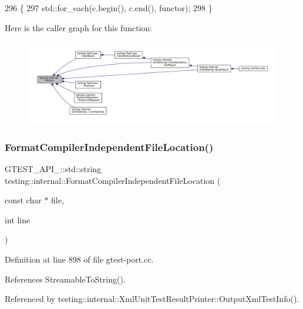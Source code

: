 \begin{DoxyCode}
296                                                   \{
297   std::for\_each(c.begin(), c.end(), functor);
298 \}
\end{DoxyCode}
Here is the caller graph for this function\+:
\nopagebreak
\begin{figure}[H]
\begin{center}
\leavevmode
\includegraphics[width=350pt]{namespacetesting_1_1internal_a52f5504ed65d116201ccb8f99a44fd7e_icgraph}
\end{center}
\end{figure}
\mbox{\label{namespacetesting_1_1internal_a1ee4cde97868c53e442d3182496a9f3c}} 
\subsubsection{\texorpdfstring{Format\+Compiler\+Independent\+File\+Location()}{FormatCompilerIndependentFileLocation()}}
{\footnotesize\ttfamily G\+T\+E\+S\+T\+\_\+\+A\+P\+I\+\_\+\+::std\+::string testing\+::internal\+::\+Format\+Compiler\+Independent\+File\+Location (\begin{DoxyParamCaption}\item[{const char $\ast$}]{file,  }\item[{int}]{line }\end{DoxyParamCaption})}



Definition at line 898 of file gtest-\/port.\+cc.



References Streamable\+To\+String().



Referenced by testing\+::internal\+::\+Xml\+Unit\+Test\+Result\+Printer\+::\+Output\+Xml\+Test\+Info().


